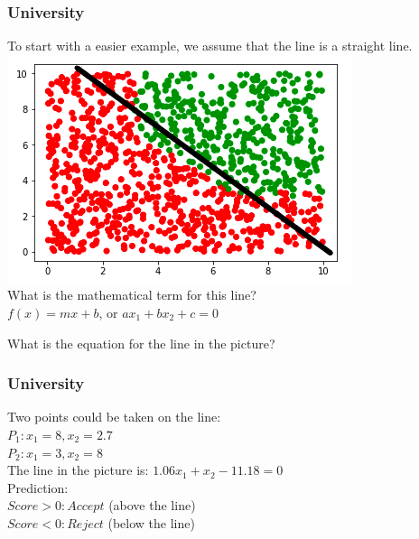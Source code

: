 \begin{frame}[fragile]
  \frametitle{University}
  To start with a easier example, we assume that the line is a straight line.\\
  \vspace{3mm}
  \includegraphics[scale=0.4]{img/uni_data_2}\\
  \vspace{3mm}
  What is the mathematical term for this line?\\
  $f(x)=mx+b$, or $ax_1+bx_2+c=0$\\
  \begin{exercise}
  What is the equation for the line in the picture?
  \end{exercise}
\end{frame}

\begin{frame}[fragile]
  \frametitle{University}
  Two points could be taken on the line:\\
  $P_1: x_1=8, x_2=2.7$\\
  $P_2: x_1=3, x_2=8$\\
  \vspace{3mm}
  The line in the picture is: $1.06x_1+x_2-11.18=0$\\
  \vspace{3mm}
  Prediction:\\
  $Score > 0: Accept$ (above the line)\\
  $Score < 0: Reject$ (below the line)
\end{frame}

